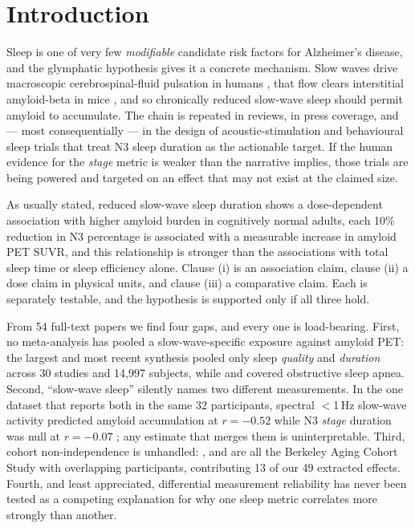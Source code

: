 \section{Introduction}
\label{sec:intro}

Sleep is one of very few \emph{modifiable} candidate risk factors for Alzheimer's disease, and
the glymphatic hypothesis gives it a concrete mechanism. Slow waves drive macroscopic
cerebrospinal-fluid pulsation in humans \citep{fultz2019}, that flow clears interstitial
amyloid-beta in mice \citep{xie2013}, and so chronically reduced slow-wave sleep should permit
amyloid to accumulate. The chain is repeated in reviews, in press coverage, and --- most
consequentially --- in the design of acoustic-stimulation and behavioural sleep trials that
treat N3 sleep duration as the actionable target. If the human evidence for the \emph{stage}
metric is weaker than the narrative implies, those trials are being powered and targeted on an
effect that may not exist at the claimed size.

 As usually stated, reduced slow-wave
sleep duration shows a dose-dependent association with higher amyloid burden in cognitively
normal adults, each 10\% reduction in N3 percentage is associated with a measurable increase in
amyloid PET SUVR, and this relationship is stronger than the associations with total sleep time
or sleep efficiency alone. Clause (i) is an association claim, clause (ii) a dose claim in
physical units, and clause (iii) a comparative claim. Each is separately testable, and the
hypothesis is supported only if all three hold.

 From 54 full-text papers we
find four gaps, and every one is load-bearing. First, no meta-analysis has pooled a
slow-wave-specific exposure against amyloid PET: the largest and most recent synthesis
\citep{chen2025} pooled only sleep \emph{quality} and \emph{duration} across 30 studies and
14{,}997 subjects, while \citet{cui2022} and \citet{bubu2020} covered obstructive sleep apnea.
Second, ``slow-wave sleep'' silently names two different measurements. In the one dataset that
reports both in the same 32 participants, spectral $<$1\,Hz slow-wave activity predicted amyloid
accumulation at $r = -0.52$ while N3 \emph{stage} duration was null at $r = -0.07$
\citep{winer2020}; any estimate that merges them is uninterpretable. Third, cohort
non-independence is unhandled: \citet{mander2015}, \citet{winer2019} and \citet{winer2020} are
all the Berkeley Aging Cohort Study with overlapping participants, contributing 13 of our 49
extracted effects. Fourth, and least appreciated, differential measurement reliability has
never been tested as a competing explanation for why one sleep metric correlates more strongly
than another.

